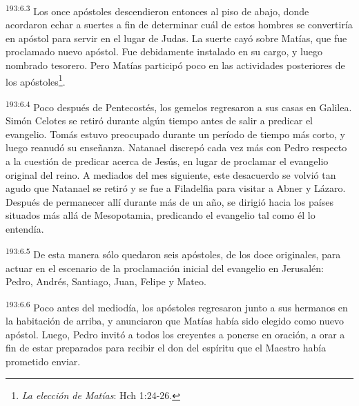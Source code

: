 \par 
\textsuperscript{193:6.3} Los once apóstoles descendieron entonces al piso de abajo, donde acordaron echar a suertes a fin de determinar cuál de estos hombres se convertiría en apóstol para servir en el lugar de Judas. La suerte cayó sobre Matías, que fue proclamado nuevo apóstol. Fue debidamente instalado en su cargo, y luego nombrado tesorero. Pero Matías participó poco en las actividades posteriores de los apóstoles\footnote{\textit{La elección de Matías}: Hch 1:24-26.}.

\par 
\textsuperscript{193:6.4} Poco después de Pentecostés, los gemelos regresaron a sus casas en Galilea. Simón Celotes se retiró durante algún tiempo antes de salir a predicar el evangelio. Tomás estuvo preocupado durante un período de tiempo más corto, y luego reanudó su enseñanza. Natanael discrepó cada vez más con Pedro respecto a la cuestión de predicar acerca de Jesús, en lugar de proclamar el evangelio original del reino. A mediados del mes siguiente, este desacuerdo se volvió tan agudo que Natanael se retiró y se fue a Filadelfia para visitar a Abner y Lázaro. Después de permanecer allí durante más de un año, se dirigió hacia los países situados más allá de Mesopotamia, predicando el evangelio tal como él lo entendía.

\par 
\textsuperscript{193:6.5} De esta manera sólo quedaron seis apóstoles, de los doce originales, para actuar en el escenario de la proclamación inicial del evangelio en Jerusalén: Pedro, Andrés, Santiago, Juan, Felipe y Mateo.

\par 
\textsuperscript{193:6.6} Poco antes del mediodía, los apóstoles regresaron junto a sus hermanos en la habitación de arriba, y anunciaron que Matías había sido elegido como nuevo apóstol. Luego, Pedro invitó a todos los creyentes a ponerse en oración, a orar a fin de estar preparados para recibir el don del espíritu que el Maestro había prometido enviar.